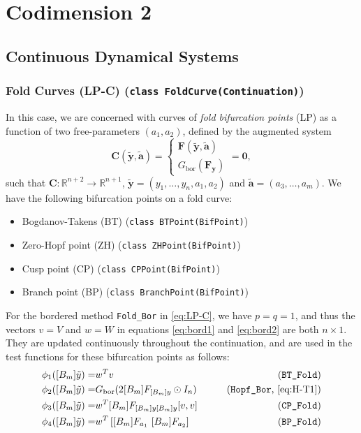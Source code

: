 \documentclass{article}[12pt]
\def\bF{\bm{F}}
\def\by{\bm{y}}
\def\bty{\bm{\tilde{y}}}
\def\bta{\bm{\tilde{a}}}
\def\bzero{\bm{0}}
\begin{document}
\section{Codimension 2}

\subsection{Continuous Dynamical Systems}

\subsubsection{Fold Curves (LP-C) (\texttt{class FoldCurve(Continuation)})}

In this case, we are concerned with curves of {\it fold bifurcation points} (LP) as a function of two free-parameters $(a_{1},a_{2})$, defined by the augmented system
\begin{equation}
\bm{C}(\bty,\bta) = \left\{\begin{array}{c} \bF(\bty,\bta) \\ G_{\mathrm{bor}}(\bF_{\by}) \end{array}\right. = \bzero,
\label{eq:LP-C}
\end{equation}
such that $\bm{C}:\mathbb{R}^{n+2} \rightarrow \mathbb{R}^{n+1}$, $\bty = (y_{1},\ldots,y_{n},a_{1},a_{2})$ and $\bta = (a_{3},\ldots,a_{m})$.  We have the following bifurcation points on a fold curve:
\begin{itemize}
\item Bogdanov-Takens (BT) (\texttt{class BTPoint(BifPoint)})
\item Zero-Hopf point (ZH) (\texttt{class ZHPoint(BifPoint)})
\item Cusp point (CP) (\texttt{class CPPoint(BifPoint)})
\item Branch point (BP) (\texttt{class BranchPoint(BifPoint)})
\end{itemize}
For the bordered method \texttt{Fold\_Bor} in \eqref{eq:LP-C}, we have $p=q=1$, and thus the vectors $v=V$ and $w=W$ in equations \eqref{eq:bord1} and \eqref{eq:bord2} are both $n\times 1$.  They are updated continuously throughout the continuation, and are used in the test functions for these bifurcation points as follows:
\begin{eqnarray}
\phi_{1}(\bty) = & w^{T}v \qquad & \mbox{(\texttt{BT\_Fold})} \label{eq:BT-T1} \\
\phi_{2}(\bty) = & G_{\mathrm{bor}}(2\bF_{\by} \odot I_{n}) \qquad & \mbox{(\texttt{Hopf\_Bor}, \eqref{eq:H-T1})} \nonumber \\
\phi_{3}(\bty) = & w^{T}\bF_{\by\by}[v,v] \qquad & \mbox{(\texttt{CP\_Fold})} \label{eq:CP-T1} \\
\phi_{4}(\bty) = & w^{T}\left[\bF_{a_{1}} \ \bF_{a_{2}}\right] \qquad & \mbox{(\texttt{BP\_Fold})} \label{eq:BPF-T1}
\end{eqnarray}
\end{document}
